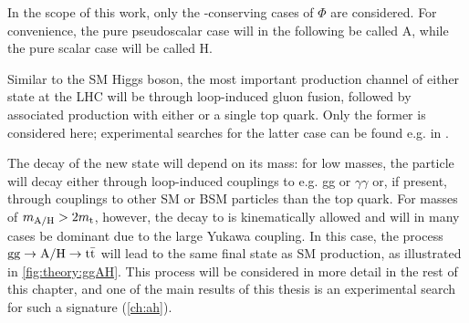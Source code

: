In the scope of this work, only the \CP-conserving cases of $\Phi$ are considered. For convenience, the pure pseudoscalar case will in the following be called A, while the pure scalar case will be called H.

Similar to the SM Higgs boson, the most important production channel of either state at the LHC will be through loop-induced gluon fusion, followed by associated production with either \ttbar or a single top quark. Only the former is considered here; experimental searches for the latter case can be found e.g. in . 

The decay of the new state will depend on its mass: for low masses, the particle will decay either through loop-induced couplings to e.g. gg or $\gamma \gamma$ or, if present, through couplings to other SM or BSM particles than the top quark. For masses of $m_{\mathrm{A/H}} > 2 m_{\mathrm{t}}$, however, the decay to \ttbar is kinematically allowed and will in many cases be dominant due to the large Yukawa coupling. In this case, the process $\mathrm{gg \rightarrow A/H \rightarrow \mathrm{t \bar{t}}}$ will lead to the same final state as SM \ttbar production, as illustrated in \cref{fig:theory:ggAH}. This process will be considered in more detail in the rest of this chapter, and one of the main results of this thesis is an experimental search for such a signature (\cref{ch:ah}).



